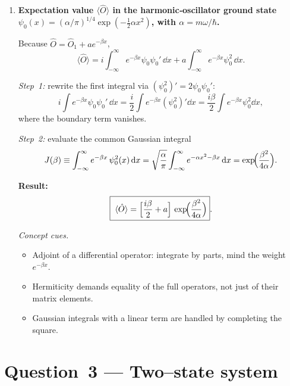 \documentclass[12pt]{article}
\begin{document}
\begin{enumerate}[label=\textbf{\alph*)},itemsep=1.5\baselineskip]
\item \textbf{Expectation value $\langle\hat O\rangle$ in the harmonic‑oscillator
ground state $\psi_{0}(x)
        = (\alpha/\pi)^{1/4}\exp(-\tfrac12\alpha x^{2})$,
      with $\alpha=m\omega/\hbar$.}

Because $\hat O=\hat O_{1}+a e^{-\beta x}$,
\[
\langle\hat O\rangle
= i\int_{-\infty}^{\infty}\!e^{-\beta x}\psi_{0}\psi_{0}'\,\dd x
  + a\int_{-\infty}^{\infty}\!e^{-\beta x}\psi_{0}^{2}\,\dd x .
\]

\textit{Step 1: } rewrite the first integral via
$(\psi_{0}^{2})' = 2\psi_{0}\psi_{0}'$:
\[
i\int e^{-\beta x}\psi_{0}\psi_{0}'\,\dd x
= \frac{i}{2}\int e^{-\beta x}(\psi_{0}^{2})'\dd x
= \frac{i\beta}{2}\int e^{-\beta x}\psi_{0}^{2}\dd x ,
\]
where the boundary term vanishes.

\textit{Step 2: } evaluate the common Gaussian integral
\[
J(\beta)\equiv\int_{-\infty}^{\infty}
  e^{-\beta x}\,\psi_{0}^{2}(x)\,\dd x
= \sqrt{\frac{\alpha}{\pi}}\int_{-\infty}^{\infty}
     e^{-\alpha x^{2}-\beta x}\,\dd x
= \exp\!\Bigl(\frac{\beta^{2}}{4\alpha}\Bigr).
\]

\textbf{Result:}
\[
\boxed{\;
\langle\hat O\rangle
= \Bigl[\frac{i\beta}{2}+a\Bigr]\,
   \exp\!\Bigl(\frac{\beta^{2}}{4\alpha}\Bigr)}.
\]

\emph{Concept cues.}
\begin{itemize}
\item Adjoint of a differential operator: integrate by parts, mind the weight
      $e^{-\beta x}$.
\item Hermiticity demands equality of the full operators, not just of their
      matrix elements.
\item Gaussian integrals with a linear term are handled by completing the
      square.
\end{itemize}

\end{enumerate}















\newpage
\section*{Question 3 — Two–state system}
\end{document}
